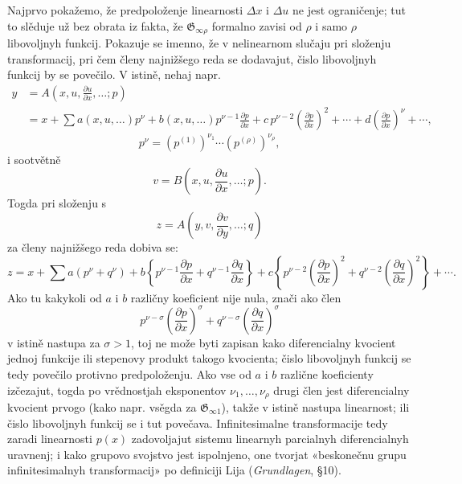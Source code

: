 \documentclass[11pt]{article}
\providecommand{\G}{\mathfrak G}
\providecommand{\D}{\Delta}
\providecommand{\p}{\partial}
\begin{document}
Najprvo pokažemo, že predpoloženje linearnosti \(\D x\) i \(\D u\) ne jest ograničenje; tut to slěduje už bez obrata iz fakta, že \(\G_{\infty\rho}\) formalno zavisi od \(\rho\) i samo \(\rho\) libovoljnyh funkcij. Pokazuje se imenno, že v nelinearnom slučaju pri složenju transformacij, pri čem členy najnižšego reda se dodavajut, čislo libovoljnyh funkcij by se povečilo. V istině, nehaj napr.
\[
\begin{aligned}
y&=A\!\left(x,u,\frac{\p u}{\p x},\ldots;p\right)\\
&=x+\sum a(x,u,\ldots)p^\nu
+b(x,u,\ldots)p^{\nu-1}\frac{\p p}{\p x}
+c\,p^{\nu-2}\left(\frac{\p p}{\p x}\right)^2+\cdots
+d\left(\frac{\p p}{\p x}\right)^\nu+\cdots,
\end{aligned}
\]
\[
p^\nu=(p^{(1)})^{\nu_1}\cdots(p^{(\rho)})^{\nu_\rho},
\]
i sootvětně
\[
v=B\!\left(x,u,\frac{\p u}{\p x},\ldots;p\right).
\]
Togda pri složenju s
\[
z=A\!\left(y,v,\frac{\p v}{\p y},\ldots;q\right)
\]
za členy najnižšego reda dobiva se:
\[
z=x+\sum a(p^\nu+q^\nu)+
b\left\{p^{\nu-1}\frac{\p p}{\p x}+q^{\nu-1}\frac{\p q}{\p x}\right\}
+c\left\{p^{\nu-2}\left(\frac{\p p}{\p x}\right)^2
+q^{\nu-2}\left(\frac{\p q}{\p x}\right)^2\right\}+\cdots.
\]
Ako tu kakykoli od \(a\) i \(b\) različny koeficient nije nula, znači ako člen
\[
p^{\nu-\sigma}\left(\frac{\p p}{\p x}\right)^\sigma
+q^{\nu-\sigma}\left(\frac{\p q}{\p x}\right)^\sigma
\]
v istině nastupa za \(\sigma>1\), toj ne može byti zapisan kako diferencialny kvocient jednoj funkcije ili stepenovy produkt takogo kvocienta; čislo libovoljnyh funkcij se tedy povečilo protivno predpoloženju. Ako vse od \(a\) i \(b\) različne koeficienty izčezajut, togda po vrědnostjah eksponentov \(\nu_1,\ldots,\nu_\rho\) drugi člen jest diferencialny kvocient prvogo (kako napr. vsěgda za \(\G_{\infty1}\)), takže v istině nastupa linearnost; ili čislo libovoljnyh funkcij se i tut povečava. Infinitesimalne transformacije tedy zaradi linearnosti \(p(x)\) zadovoljajut sistemu linearnyh parcialnyh diferencialnyh uravnenj; i kako grupovo svojstvo jest ispolnjeno, one tvorjat «beskonečnu grupu infinitesimalnyh transformacij» po definiciji Lija (\emph{Grundlagen}, \S{}10).
\end{document}
